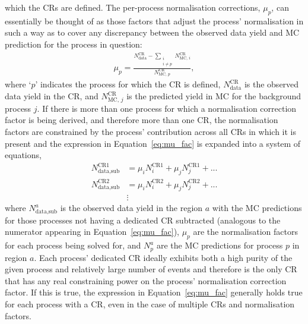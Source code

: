 which the CRs are defined.
The per-process normalisation corrections, $\mu_p$, can essentially be thought of as those factors
that adjust the process' normalisation in such a way as to cover any discrepancy between the observed
data yield and MC prediction for the process in question:
\begin{align}
    \mu_{p} = \frac{  N_{\text{data}}^{\text{CR}} - \sum\limits_{\substack{i \\ i\ne p}} N_{\text{MC},\,i}^{\text{CR}}} { N_{\text{MC},\,p}^{\text{CR}}},
    \label{eq:mu_fac}
\end{align}
where `$p$' indicates the process for which the CR is defined, $N_{\text{data}}^{\text{CR}}$ is the observed
data yield in the CR, and $N_{\text{MC},\,j}^{\text{CR}}$ is the predicted yield in MC for the background
process $j$.
If there is more than one process for which a normalisation correction factor is being derived, and therefore
more than one CR, the normalisation factors are constrained by the process' contribution across all CRs in which
it is present and the expression in Equation~\ref{eq:mu_fac} is expanded into a system of equations,
\begin{align}
    N_{\text{data,sub}}^{\text{CR1}} &= \mu_i N_i^{\text{CR1}} + \mu_j N_j^{\text{CR1}} + ... \\
    N_{\text{data,sub}}^{\text{CR2}} &= \mu_i N_i^{\text{CR2}} + \mu_j N_j^{\text{CR2}} + ... \\
        &\vdots
    \label{eq:mu_fac_expand}
\end{align}
where $N_{\text{data,sub}}^{a}$ is the observed data yield in the region $a$ with the MC predictions
for those processes not having a dedicated  CR subtracted (analogous to the numerator appearing in Equation~\ref{eq:mu_fac}),
$\mu_p$ are the normalisation factors for each process being solved for, and $N_p^{a}$ are the MC predictions
for process $p$ in region $a$.
Each process' dedicated CR ideally exhibits both a high purity of the given process and relatively large
number of events and therefore {\color{red}{too large may indicate large extrapolation}}
is the only CR that has any real constraining power on the process' normalisation correction factor.
If this is true, the expression in Equation~\ref{eq:mu_fac} generally holds true for each process with a
CR, even in the case of multiple CRs and
normalisation factors.

